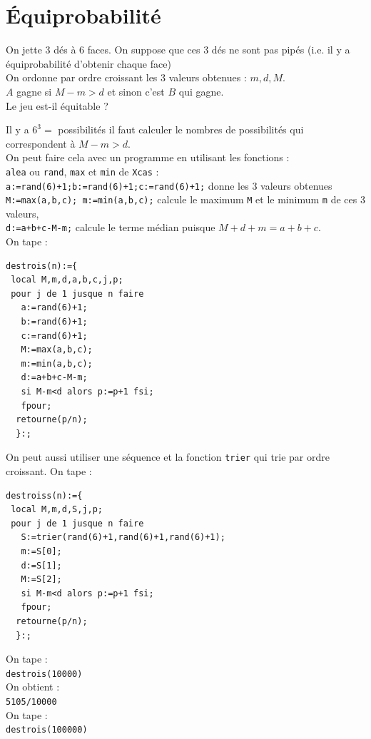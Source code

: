 \documentclass[a4paper,11pt]{book}
\begin{document}
\section{\'Equiprobabilit\'e}
On jette 3 d\'es \`a 6 faces. On suppose que ces 3 d\'es ne sont pas pip\'es 
(i.e. il y  a \'equiprobabilit\'e d'obtenir chaque face)\\
On ordonne par ordre croissant les 3 valeurs obtenues : $m,d,M$.\\
$A$ gagne si $M-m>d$ et sinon c'est $B$ qui gagne.\\
Le jeu est-il \'equitable ?

Il y a $6^3=$ possibilit\'es il faut calculer le nombres de possibilit\'es qui
correspondent \`a  $M-m>d$.\\
On peut faire cela avec un programme en utilisant les fonctions :\\
{\tt alea} ou {\tt  rand}, {\tt max} et {\tt min} de {\tt Xcas} :\\
{\tt a:=rand(6)+1;b:=rand(6)+1;c:=rand(6)+1;} donne les 3 valeurs obtenues\\
{\tt M:=max(a,b,c); m:=min(a,b,c);} calcule le maximum {\tt M} et le minimum 
{\tt m} de ces 3 valeurs,\\
{\tt d:=a+b+c-M-m;} calcule le terme m\'edian puisque $M+d+m=a+b+c$.\\
On tape :\\
\begin{verbatim}
destrois(n):={
 local M,m,d,a,b,c,j,p;
 pour j de 1 jusque n faire 
   a:=rand(6)+1;
   b:=rand(6)+1;
   c:=rand(6)+1;
   M:=max(a,b,c);
   m:=min(a,b,c);
   d:=a+b+c-M-m;
   si M-m<d alors p:=p+1 fsi;
   fpour;
  retourne(p/n);
  }:;
\end{verbatim}
On peut aussi utiliser une s\'equence et la fonction {\tt trier} qui trie par 
ordre croissant.
On tape :\\
\begin{verbatim}
destroiss(n):={
 local M,m,d,S,j,p;
 pour j de 1 jusque n faire 
   S:=trier(rand(6)+1,rand(6)+1,rand(6)+1);
   m:=S[0];
   d:=S[1];
   M:=S[2];
   si M-m<d alors p:=p+1 fsi;
   fpour;
  retourne(p/n);
  }:;
\end{verbatim}
On tape :\\
{\tt destrois(10000)}\\
On obtient :\\
{\tt 5105/10000}\\
On tape :\\
{\tt destrois(100000)}\\
\end{document}
